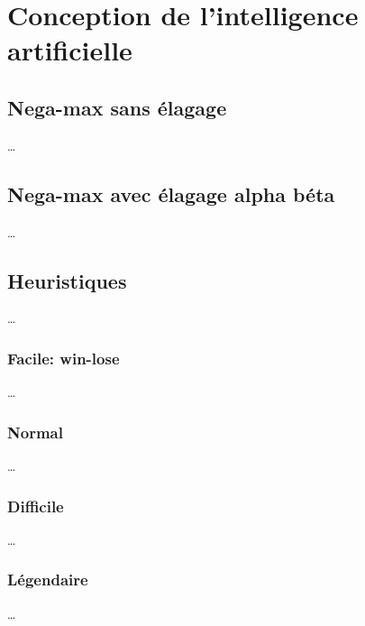 \chapter{Conception de l'intelligence artificielle} \label{chapter:intelligence-artificielle}


\section{Nega-max sans élagage}

…

\section{Nega-max avec élagage alpha béta}

…

\section{Heuristiques}

…

\subsection{Facile: win-lose}

…

\subsection{Normal}

…

\subsection{Difficile}

…

\subsection{Légendaire}

…

